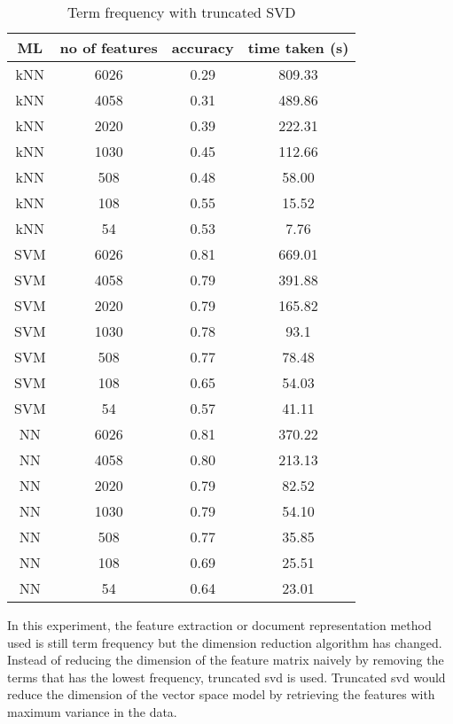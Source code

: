\begin{table} [h]
	\centering
	\caption{Term frequency with truncated SVD}
	\label{tbl:termFrequencySvd}
	\begin{tabular}{|| c | c | c | c||}
		\hline
		ML & no of features & accuracy & time taken (s) \\ [0.5ex]
		\hline\hline
		kNN & 6026 & 0.29 & 809.33 \\
		\hline
		kNN & 4058 & 0.31 & 489.86 \\ 
		\hline
		kNN & 2020 & 0.39 & 222.31 \\ 
		\hline
		kNN & 1030 & 0.45 & 112.66 \\ 
		\hline
		kNN & 508 & 0.48 & 58.00 \\ 
		\hline
		kNN & 108 & 0.55 & 15.52 \\ 
		\hline
		kNN & 54 & 0.53 & 7.76 \\ 
		\hline\hline
		SVM & 6026 & 0.81 & 669.01 \\
		\hline
		SVM & 4058 & 0.79 & 391.88 \\
		\hline
		SVM & 2020 & 0.79 & 165.82 \\
		\hline
		SVM & 1030 & 0.78 & 93.1 \\
		\hline
		SVM & 508 & 0.77 & 78.48 \\
		\hline
		SVM & 108 & 0.65 & 54.03 \\
		\hline
		SVM & 54 & 0.57 & 41.11 \\
		\hline\hline
		NN & 6026 & 0.81 & 370.22 \\
		\hline
		NN & 4058 & 0.80 & 213.13 \\
		\hline
		NN & 2020 & 0.79 & 82.52 \\
		\hline
		NN & 1030 & 0.79 & 54.10 \\
		\hline
		NN & 508 & 0.77 & 35.85 \\
		\hline
		NN & 108 & 0.69 & 25.51 \\
		\hline
		NN & 54 & 0.64 & 23.01 \\
		\hline
	\end{tabular}
\end{table}

In this experiment, the feature extraction or document representation method used is still term frequency but the dimension reduction algorithm has changed. Instead of reducing the dimension of the feature matrix naively by removing the terms that has the lowest frequency, truncated \ac{svd} is used. Truncated \ac{svd} would reduce the dimension of the vector space model by retrieving the features with maximum variance in the data.

